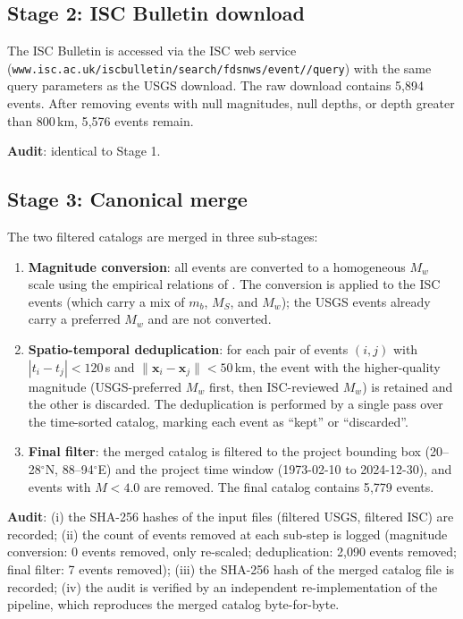 \documentclass[10pt,a4paper,twocolumn]{article}
\begin{document}
\subsection{Stage 2: ISC Bulletin download}

The ISC Bulletin is accessed via the ISC web service (\texttt{www.isc.ac.uk/iscbulletin/\allowbreak search/\allowbreak fdsnws/\allowbreak event//\allowbreak query}) with the same query parameters as the USGS download. The raw download contains 5{,}894 events. After removing events with null magnitudes, null depths, or depth greater than 800\,km, 5{,}576 events remain.

\textbf{Audit}: identical to Stage 1.

\subsection{Stage 3: Canonical merge}

The two filtered catalogs are merged in three sub-stages:

\begin{enumerate}[leftmargin=1.2em,itemsep=2pt,topsep=2pt]
\item \textbf{Magnitude conversion}: all events are converted to a homogeneous $M_w$ scale using the empirical relations of \cite{scordilis2006}. The conversion is applied to the ISC events (which carry a mix of $m_b$, $M_S$, and $M_w$); the USGS events already carry a preferred $M_w$ and are not converted.
\item \textbf{Spatio-temporal deduplication}: for each pair of events $(i, j)$ with $|t_i - t_j| < 120$\,s and $\|\mathbf{x}_i - \mathbf{x}_j\| < 50$\,km, the event with the higher-quality magnitude (USGS-preferred $M_w$ first, then ISC-reviewed $M_w$) is retained and the other is discarded. The deduplication is performed by a single pass over the time-sorted catalog, marking each event as ``kept'' or ``discarded''.
\item \textbf{Final filter}: the merged catalog is filtered to the project bounding box (20--28$^\circ$N, 88--94$^\circ$E) and the project time window (1973-02-10 to 2024-12-30), and events with $M < 4.0$ are removed. The final catalog contains 5{,}779 events.
\end{enumerate}

\textbf{Audit}: (i) the SHA-256 hashes of the input files (filtered USGS, filtered ISC) are recorded; (ii) the count of events removed at each sub-step is logged (magnitude conversion: 0 events removed, only re-scaled; deduplication: 2{,}090 events removed; final filter: 7 events removed); (iii) the SHA-256 hash of the merged catalog file is recorded; (iv) the audit is verified by an independent re-implementation of the pipeline, which reproduces the merged catalog byte-for-byte.
\end{document}
